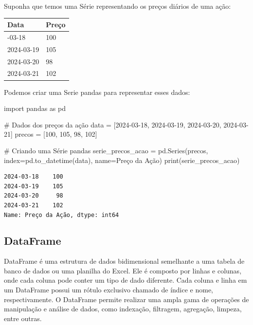 \documentclass[
  portuguese,
  letterpaper,
  DIV=11,
  numbers=noendperiod]{scrreprt}
\newenvironment{Shaded}{\begin{snugshade}}{\end{snugshade}}
\newcommand{\BuiltInTok}[1]{\textcolor[rgb]{0.00,0.23,0.31}{#1}}
\newcommand{\CommentTok}[1]{\textcolor[rgb]{0.37,0.37,0.37}{#1}}
\newcommand{\DecValTok}[1]{\textcolor[rgb]{0.68,0.00,0.00}{#1}}
\newcommand{\ImportTok}[1]{\textcolor[rgb]{0.00,0.46,0.62}{#1}}
\newcommand{\NormalTok}[1]{\textcolor[rgb]{0.00,0.23,0.31}{#1}}
\newcommand{\OperatorTok}[1]{\textcolor[rgb]{0.37,0.37,0.37}{#1}}
\newcommand{\StringTok}[1]{\textcolor[rgb]{0.13,0.47,0.30}{#1}}
\theoremstyle{definition}
\theoremstyle{remark}
\begin{document}
Suponha que temos uma Série representando os preços diários de uma ação:

\begin{longtable}[]{@{}ll@{}}
\toprule\noalign{}
Data & Preço \\
\midrule\noalign{}
\endhead
\bottomrule\noalign{}
\endlastfoot
2024-03-18 & 100 \\
2024-03-19 & 105 \\
2024-03-20 & 98 \\
2024-03-21 & 102 \\
\end{longtable}

Podemos criar uma Serie pandas para representar esses dados:

\begin{Shaded}
\begin{Highlighting}[]
\ImportTok{import}\NormalTok{ pandas }\ImportTok{as}\NormalTok{ pd}

\CommentTok{\# Dados dos preços da ação}
\NormalTok{data }\OperatorTok{=}\NormalTok{ [}\StringTok{\textquotesingle{}2024{-}03{-}18\textquotesingle{}}\NormalTok{, }\StringTok{\textquotesingle{}2024{-}03{-}19\textquotesingle{}}\NormalTok{, }\StringTok{\textquotesingle{}2024{-}03{-}20\textquotesingle{}}\NormalTok{, }\StringTok{\textquotesingle{}2024{-}03{-}21\textquotesingle{}}\NormalTok{]}
\NormalTok{precos }\OperatorTok{=}\NormalTok{ [}\DecValTok{100}\NormalTok{, }\DecValTok{105}\NormalTok{, }\DecValTok{98}\NormalTok{, }\DecValTok{102}\NormalTok{]}

\CommentTok{\# Criando uma Série pandas}
\NormalTok{serie\_precos\_acao }\OperatorTok{=}\NormalTok{ pd.Series(precos, index}\OperatorTok{=}\NormalTok{pd.to\_datetime(data), name}\OperatorTok{=}\StringTok{\textquotesingle{}Preço da Ação\textquotesingle{}}\NormalTok{)}
\BuiltInTok{print}\NormalTok{(serie\_precos\_acao)}
\end{Highlighting}
\end{Shaded}

\begin{verbatim}
2024-03-18    100
2024-03-19    105
2024-03-20     98
2024-03-21    102
Name: Preço da Ação, dtype: int64
\end{verbatim}

\subsection{DataFrame}\label{dataframe}

DataFrame é uma estrutura de dados bidimensional semelhante a uma tabela
de banco de dados ou uma planilha do Excel. Ele é composto por linhas e
colunas, onde cada coluna pode conter um tipo de dado diferente. Cada
coluna e linha em um DataFrame possui um rótulo exclusivo chamado de
índice e nome, respectivamente. O DataFrame permite realizar uma ampla
gama de operações de manipulação e análise de dados, como indexação,
filtragem, agregação, limpeza, entre outras.
\end{document}
